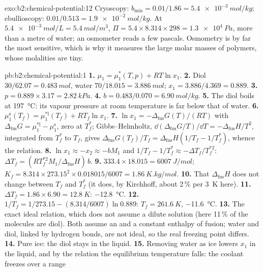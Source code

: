 \begin{solution}{exo:b2:chemical-potential:12}
Cryoscopy: $b_{\min} = 0.01/1.86 = \qty{5.4e-3}{mol/kg}$; ebullioscopy:
$0.01/0.513 = \qty{1.9e-2}{mol/kg}$. At $\qty{5.4e-3}{mol/L} =
\qty{5.4}{mol/m^3}$, $\Pi = 5.4 \times 8.314 \times 298 = \qty{1.3e4}{Pa}$,
more than a metre of water; an osmometer reads a few pascals. Osmometry is by
far the most sensitive, which is why it measures the large molar masses of
polymers, whose molalities are tiny.
\end{solution}

\begin{solution}{pb:b2:chemical-potential:1}
\textbf{1.} $\mu_1 = \mu_1^*(T, p) + RT\ln x_1$.
\textbf{2.} Diol $30/62.07 = \qty{0.483}{mol}$, water $70/18.015 =
\qty{3.886}{mol}$; $x_1 = 3.886/4.369 = 0.889$.
\textbf{3.} $p = 0.889 \times 3.17 = \qty{2.82}{kPa}$.
\textbf{4.} $b = 0.483/0.070 = \qty{6.90}{mol/kg}$.
\textbf{5.} The diol boils at \qty{197}{\celsius}: its vapour pressure at room
temperature is far below that of water.
\textbf{6.} $\mu_1^{\text{s}}(T_f) = \mu_1^{*\text{l}}(T_f) + RT_f\ln x_1$.
\textbf{7.} $\ln x_1 = -\Delta_{\text{fus}}G(T)/(RT)$ with
$\Delta_{\text{fus}}G = \mu_1^{*\text{l}} - \mu_1^{\text{s}}$, zero at $T_f^*$;
Gibbs--Helmholtz, $\dd(\Delta_{\text{fus}}G/T)/\dd T = -\Delta_{\text{fus}}H/T^2$,
integrated from $T_f^*$ to $T_f$, gives $\Delta_{\text{fus}}G(T_f)/T_f =
\Delta_{\text{fus}}H(1/T_f - 1/T_f^*)$, whence the relation.
\textbf{8.} $\ln x_1 \approx -x_2 \approx -bM_1$ and $1/T_f - 1/T_f^* \approx
-\Delta T_f/T_f^{*2}$: $\Delta T_f = (RT_f^{*2}M_1/\Delta_{\text{fus}}H)\,b$.
\textbf{9.} $333.4 \times 18.015 = \qty{6007}{J/mol}$; $K_f = 8.314 \times
273.15^2 \times 0.018015/6007 = \qty{1.86}{K.kg/mol}$.
\textbf{10.} That $\Delta_{\text{fus}}H$ does not change between $T_f$ and
$T_f^*$ (it does, by Kirchhoff, about 2\,\% per \qty{3}{K} here).
\textbf{11.} $\Delta T_f = 1.86 \times 6.90 = \qty{12.8}{K}$: \qty{-12.8}{\celsius}.
\textbf{12.} $1/T_f = 1/273.15 - (8.314/6007)\ln 0.889$: $T_f = \qty{261.6}{K}$,
\qty{-11.6}{\celsius}.
\textbf{13.} The exact ideal relation, which does not assume a dilute
solution (here 11\,\% of the molecules are diol). Both assume an 
and a constant enthalpy of fusion; water and diol, linked by hydrogen bonds,
are not ideal, so the real freezing point differs.
\textbf{14.} Pure ice: the diol stays in the liquid.
\textbf{15.} Removing water as ice lowers $x_1$ in the liquid, and by the
relation the equilibrium temperature falls: the coolant freezes over a range

\end{solution}

